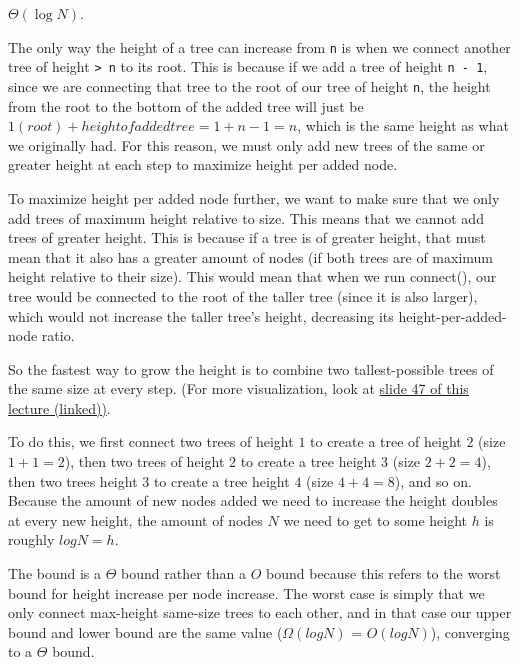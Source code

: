 \begin{solution}[1.5in]

$\Theta(\log N)$.

The only way the height of a tree can increase from \lstinline$n$ is when we connect another tree of height \lstinline$> n$ to its root. This is because if we add a tree of height \lstinline$n - 1$, since we are connecting that tree to the root of our tree of height \lstinline$n$, the height from the root to the bottom of the added tree will just be 
$1 (root) + height of added tree = 1 + n - 1 = n$,
which is the same height as what we originally had. For this reason, we must only add new trees of the same or greater height at each step to maximize height per added node.

To maximize height per added node further, we want to make sure that we only add trees of maximum height relative to size. This means that we cannot add trees of greater height. This is because if a tree is of greater height, that must mean that it also has a greater amount of nodes (if both trees are of maximum height relative to their size). This would mean that when we run connect(), our tree would be connected to the root of the taller tree (since it is also larger), which would not increase the taller tree's height, decreasing its height-per-added-node ratio. 


So the fastest way to grow the height is to combine two tallest-possible trees of the same size at every step. (For more visualization, look at  \href{ https://docs.google.com/presentation/d/1I9Jzt95GvxRqwGMzN7DSEIREKhMZ0qEUzPyWLl6CU5g/edit#slide=id.g4fdd128987_4_292}{slide 47 of this lecture (linked))}. 

To do this, we first connect two trees of height $1$ to create a tree of height $2$ (size $1 + 1 = 2$), then two trees of height $2$ to create a tree height $3$ (size $2 + 2 = 4$), then two trees height $3$ to create a tree height $4$ (size $4 + 4 = 8$), and so on. Because the amount of new nodes added we need to increase the height doubles at every new height, the amount of nodes $N$ we need to get to some height $h$ is roughly $log N = h$. 

The bound is a $\Theta$ bound rather than a $O$ bound because this refers to the worst  bound for height increase per node increase. The worst case is simply that we only connect max-height same-size trees to each other, and in that case our upper bound and lower bound are the same value ($\Omega(log N)$ = $O(log N)$), converging to a $\Theta$ bound. 
\end{solution}

